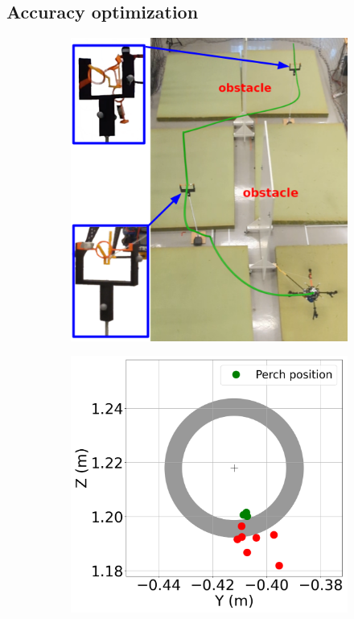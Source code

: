 \subsection{Accuracy optimization} \label{sec:AccOptExp}

\begin{figure} [htp]
    \begin{subfigure}{0.63\linewidth}
      \includegraphics[width=\linewidth]{figures/robust_accurate/ring_opti_v1.png}
    \end{subfigure}\hfill
    \begin{subfigure}{0.37\linewidth}
        \includegraphics[width=\linewidth]{figures/robust_accurate/Exp_ring_no_opti_full_zoom.png}

\end{subfigure}
\end{figure}
